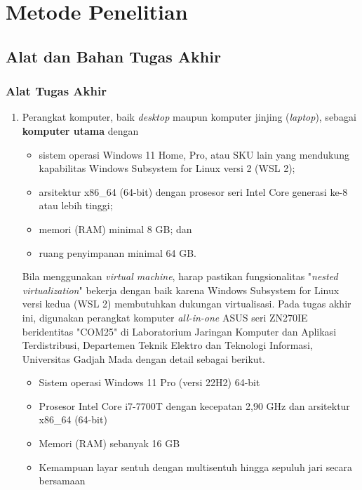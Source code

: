 \chapter{Metode Penelitian}

\section{Alat dan Bahan Tugas Akhir}

\subsection{Alat Tugas Akhir}

\begin{enumerate}
    \item Perangkat komputer, baik \textit{desktop} maupun komputer jinjing (\textit{laptop}), sebagai \textbf{komputer utama} dengan
    \begin{itemize}
        \item sistem operasi Windows 11 Home, Pro, atau SKU lain yang mendukung kapabilitas Windows Subsystem for Linux versi 2 (WSL 2);
        \item arsitektur x86\_64 (64-bit) dengan prosesor seri Intel Core generasi ke-8 atau lebih tinggi;
        \item memori (RAM) minimal 8 GB; dan
        \item ruang penyimpanan minimal 64 GB.
    \end{itemize} Bila menggunakan \textit{virtual machine}, harap pastikan fungsionalitas "\textit{nested virtualization}" bekerja dengan baik karena Windows Subsystem for Linux versi kedua (WSL 2) membutuhkan dukungan virtualisasi. Pada tugas akhir ini, digunakan perangkat komputer \textit{all-in-one} ASUS seri ZN270IE beridentitas "COM25" di Laboratorium Jaringan Komputer dan Aplikasi Terdistribusi, Departemen Teknik Elektro dan Teknologi Informasi, Universitas Gadjah Mada dengan detail sebagai berikut.
    \begin{itemize}
        \item Sistem operasi Windows 11 Pro (versi 22H2) 64-bit
        \item Prosesor Intel Core i7-7700T dengan kecepatan 2,90 GHz dan arsitektur x86\_64 (64-bit)
        \item Memori (RAM) sebanyak 16 GB
        \item Kemampuan layar sentuh dengan multisentuh hingga sepuluh jari secara bersamaan
    \end{itemize}


\end{enumerate}
